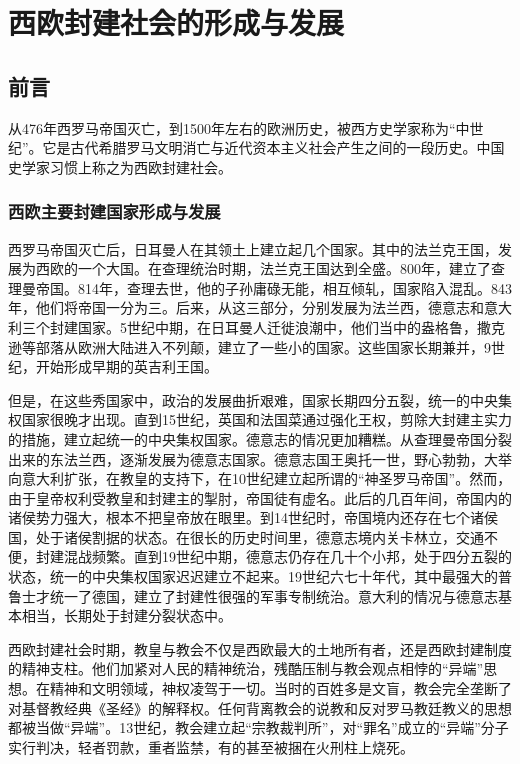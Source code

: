 \section{西欧封建社会的形成与发展}
\subsection{前言}
从476年西罗马帝国灭亡，到1500年左右的欧洲历史，被西方史学家称为“中世纪”。它是古代希腊罗马文明消亡与近代资本主义社会产生之间的一段历史。中国史学家习惯上称之为西欧封建社会。

\subsubsection{西欧主要封建国家形成与发展}

西罗马帝国灭亡后，日耳曼人在其领土上建立起几个国家。其中的法兰克王国，发展为西欧的一个大国。在查理统治时期，法兰克王国达到全盛。800年，建立了查理曼帝国。814年，查理去世，他的子孙庸碌无能，相互倾轧，国家陷入混乱。843年，他们将帝国一分为三。后来，从这三部分，分别发展为法兰西，德意志和意大利三个封建国家。5世纪中期，在日耳曼人迁徙浪潮中，他们当中的盎格鲁，撒克逊等部落从欧洲大陆进入不列颠，建立了一些小的国家。这些国家长期兼并，9世纪，开始形成早期的英吉利王国。

但是，在这些秀国家中，政治的发展曲折艰难，国家长期四分五裂，统一的中央集权国家很晚才出现。直到15世纪，英国和法国菜通过强化王权，剪除大封建主实力的措施，建立起统一的中央集权国家。德意志的情况更加糟糕。从查理曼帝国分裂出来的东法兰西，逐渐发展为德意志国家。德意志国王奥托一世，野心勃勃，大举向意大利扩张，在教皇的支持下，在10世纪建立起所谓的“神圣罗马帝国”。然而，由于皇帝权利受教皇和封建主的掣肘，帝国徒有虚名。此后的几百年间，帝国内的诸侯势力强大，根本不把皇帝放在眼里。到14世纪时，帝国境内还存在七个诸侯国，处于诸侯割据的状态。在很长的历史时间里，德意志境内关卡林立，交通不便，封建混战频繁。直到19世纪中期，德意志仍存在几十个小邦，处于四分五裂的状态，统一的中央集权国家迟迟建立不起来。19世纪六七十年代，其中最强大的普鲁士才统一了德国，建立了封建性很强的军事专制统治。意大利的情况与德意志基本相当，长期处于封建分裂状态中。

西欧封建社会时期，教皇与教会不仅是西欧最大的土地所有者，还是西欧封建制度的精神支柱。他们加紧对人民的精神统治，残酷压制与教会观点相悖的“异端”思想。在精神和文明领域，神权凌驾于一切。当时的百姓多是文盲，教会完全垄断了对基督教经典《圣经》的解释权。任何背离教会的说教和反对罗马教廷教义的思想都被当做“异端”。13世纪，教会建立起“宗教裁判所”，对“罪名”成立的“异端”分子实行判决，轻者罚款，重者监禁，有的甚至被捆在火刑柱上烧死。

